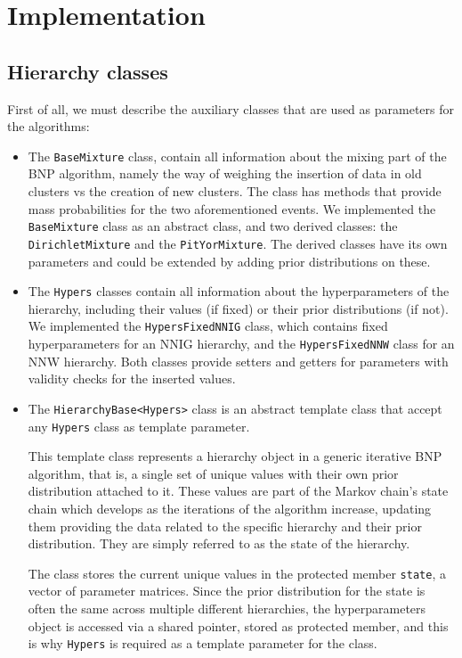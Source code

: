 \part{Implementation}

\chapter{Hierarchy classes}
First of all, we must describe the auxiliary classes that are used as parameters for the algorithms:
\begin{itemize}
	\item The \verb|BaseMixture| class, contain all information about the mixing part of the BNP algorithm, namely the way of weighing the insertion of data in old clusters vs the creation of new clusters. The class has methods that provide mass probabilities for the two aforementioned events. We implemented the \verb|BaseMixture| class as an abstract class, and two derived classes: the \verb|DirichletMixture| and the \verb|PitYorMixture|. The derived classes have its own parameters and could be extended by adding prior distributions on these.

	\item The \verb|Hypers| classes contain all information about the hyperparameters of the hierarchy, including their values (if fixed) or their prior distributions (if not). We implemented the \verb|HypersFixedNNIG| class, which contains fixed hyperparameters for an NNIG hierarchy, and the \verb|HypersFixedNNW| class for an NNW hierarchy. Both classes provide setters and getters for parameters with validity checks for the inserted values.
	
	\item The \verb|HierarchyBase<Hypers>| class is an abstract template class that accept any \verb|Hypers| class as template parameter.
	
	
This template class represents a hierarchy object in a generic iterative BNP
algorithm, that is, a single set of unique values with their own prior
distribution attached to it. These values are part of the Markov chain's
state chain which develops as the iterations of the algorithm increase, updating them providing the data related to the specific hierarchy and their prior distribution.
They are simply referred to as the state of the hierarchy. 

The class stores the current unique values in the protected member \verb|state|, a vector of parameter matrices.
Since the prior distribution for the state is often the same across multiple
different hierarchies, the hyperparameters object is accessed via a shared
pointer, stored as protected member, and this is why \verb|Hypers| is required as a template parameter for the class. 


\end{itemize}
